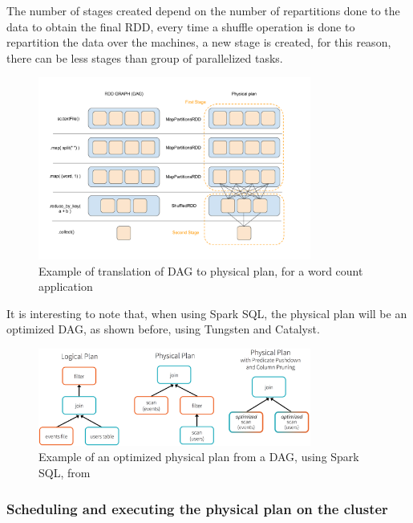 \documentclass[11pt]{book} %
\begin{document}
          The number of stages created depend on the number of repartitions done to the data to obtain the final RDD, every time a shuffle operation is done to repartition the data over the machines, a new stage is created, for this reason, there can be less stages than group of parallelized tasks.

          \begin{figure}[!ht]
            \centering
            \includegraphics[width=0.8\textwidth]{DAG_to_phisical_plan.png}
            \caption{Example of translation of DAG to physical plan, for a word count application}
            \label{img:DAG_to_physical}
          \end{figure}

          It is interesting to note that, when using Spark SQL, the physical plan will be an optimized DAG, as shown before, using Tungsten and Catalyst.

          \begin{figure}[!ht]
            \centering
            \includegraphics[width=0.8\textwidth]{Spark_logical_to_phisical_plan.jpg}
            \caption{Example of an optimized physical plan from a DAG, using Spark SQL, from \cite{optimized_dag_to_physical}}
          \end{figure}

        \subsubsection{Scheduling and executing the physical plan on the cluster}
\end{document}
